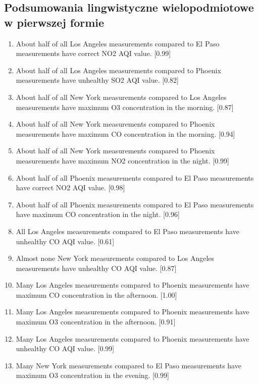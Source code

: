\documentclass{classrep}
\begin{document}
{        \subsection{Podsumowania lingwistyczne wielopodmiotowe w pierwszej formie} {
            \begin{enumerate}
                \item About half of all Los Angeles measurements compared to El Paso measurements have correct NO2 AQI value. [0.99]
                \item About half of all Los Angeles measurements compared to Phoenix measurements have unhealthy SO2 AQI value. [0.82]
                \item About half of all New York measurements compared to Los Angeles measurements have maximum O3 concentration in the morning. [0.87]
                \item About half of all New York measurements compared to Phoenix measurements have maximum CO concentration in the morning. [0.94]
                \item About half of all New York measurements compared to Phoenix measurements have maximum NO2 concentration in the night. [0.99]
                \item About half of all Phoenix measurements compared to El Paso measurements have correct NO2 AQI value. [0.98]
                \item About half of all Phoenix measurements compared to El Paso measurements have maximum CO concentration in the night. [0.96]
                \item All Los Angeles measurements compared to El Paso measurements have unhealthy CO AQI value. [0.61]
                \item Almost none New York measurements compared to Los Angeles measurements have unhealthy CO AQI value. [0.87]
                \item Many Los Angeles measurements compared to Phoenix measurements have maximum CO concentration in the afternoon. [1.00]
                \item Many Los Angeles measurements compared to Phoenix measurements have maximum O3 concentration in the afternoon. [0.91]
                \item Many Los Angeles measurements compared to Phoenix measurements have unhealthy CO AQI value. [0.99]
                \item Many New York measurements compared to El Paso measurements have maximum O3 concentration in the evening. [0.99]

\end{enumerate}}}
\end{document}
